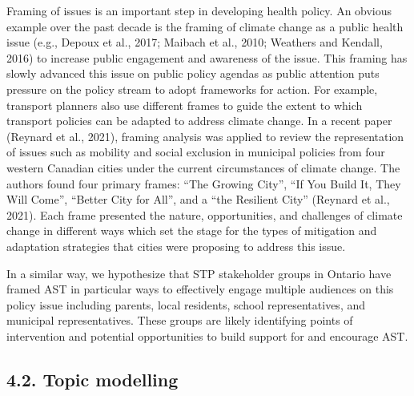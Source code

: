 \documentclass[]{elsarticle} %
\begin{document}
Framing of issues is an important step in developing health policy. An
obvious example over the past decade is the framing of climate change as
a public health issue (e.g., Depoux et al., 2017; Maibach et al., 2010;
Weathers and Kendall, 2016) to increase public engagement and awareness
of the issue. This framing has slowly advanced this issue on public
policy agendas as public attention puts pressure on the policy stream to
adopt frameworks for action. For example, transport planners also use
different frames to guide the extent to which transport policies can be
adapted to address climate change. In a recent paper (Reynard et al.,
2021), framing analysis was applied to review the representation of
issues such as mobility and social exclusion in municipal policies from
four western Canadian cities under the current circumstances of climate
change. The authors found four primary frames: ``The Growing City'',
``If You Build It, They Will Come'', ``Better City for All'', and a
``the Resilient City'' (Reynard et al., 2021). Each frame presented the
nature, opportunities, and challenges of climate change in different
ways which set the stage for the types of mitigation and adaptation
strategies that cities were proposing to address this issue.

In a similar way, we hypothesize that STP stakeholder groups in Ontario
have framed AST in particular ways to effectively engage multiple
audiences on this policy issue including parents, local residents,
school representatives, and municipal representatives. These groups are
likely identifying points of intervention and potential opportunities to
build support for and encourage AST.

\hypertarget{topic-modelling}{%
\subsection{4.2. Topic modelling}\label{topic-modelling}}
\end{document}
